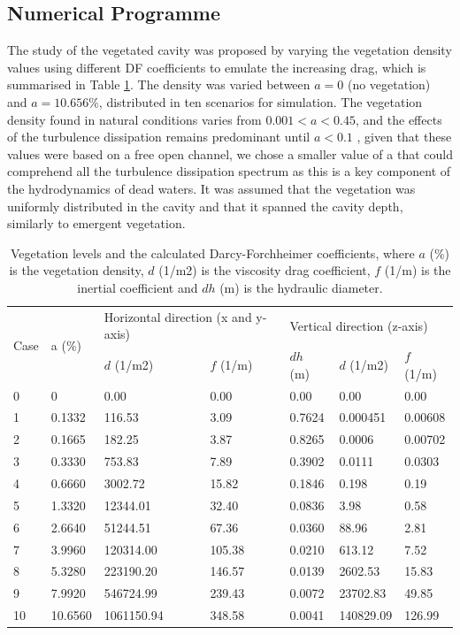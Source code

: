 \subsection{Numerical Programme}
The study of the vegetated cavity was proposed by varying the vegetation density values using different DF coefficients to emulate the increasing drag, which is summarised in Table \ref{tab:art4:cases}. The density was varied between $a = 0$ (no vegetation) and $a = 10.656$\%, distributed in ten scenarios for simulation. The vegetation density found in natural conditions varies from $0.001<a<0.45$, and the effects of the turbulence dissipation remains predominant until  $a<0.1$ \cite{Nepf2012}, given that these values were based on a free open channel, we chose a smaller value of a that could comprehend all the turbulence dissipation spectrum as this is a key component of the hydrodynamics of dead waters. It was assumed that the vegetation was uniformly distributed in the cavity and that it spanned the cavity depth, similarly to emergent vegetation.

\begin{table}[]
\centering
\begin{tabular}{@{}lllllll@{}}
\toprule
\multirow{2}{*}{Case} & \multirow{2}{*}{a (\%)} & \multicolumn{2}{l}{Horizontal direction (x and y-axis)} & \multicolumn{3}{l}{Vertical direction (z-axis)} \\ \cmidrule(l){3-7} 
   &         & $d$ (1/m2)   & $f$ (1/m) & $dh$ (m) & $d$ (1/m2)  & $f$ (1/m) \\ \midrule
0  & 0       & 0.00       & 0.00    & 0.00   & 0.00      & 0.00    \\
1  & 0.1332  & 116.53     & 3.09    & 0.7624 & 0.000451  & 0.00608 \\
2  & 0.1665  & 182.25     & 3.87    & 0.8265 & 0.0006    & 0.00702 \\
3  & 0.3330  & 753.83     & 7.89    & 0.3902 & 0.0111    & 0.0303  \\
4  & 0.6660  & 3002.72    & 15.82   & 0.1846 & 0.198     & 0.19    \\
5  & 1.3320  & 12344.01   & 32.40   & 0.0836 & 3.98      & 0.58    \\
6  & 2.6640  & 51244.51   & 67.36   & 0.0360 & 88.96     & 2.81    \\
7  & 3.9960  & 120314.00  & 105.38  & 0.0210 & 613.12    & 7.52    \\
8  & 5.3280  & 223190.20  & 146.57  & 0.0139 & 2602.53   & 15.83   \\
9  & 7.9920  & 546724.99  & 239.43  & 0.0072 & 23702.83  & 49.85   \\
10 & 10.6560 & 1061150.94 & 348.58  & 0.0041 & 140829.09 & 126.99  \\ \bottomrule
\end{tabular}
\caption{Vegetation levels and the calculated Darcy-Forchheimer coefficients, where $a$ (\%) is the vegetation density, $d$ (1/m2) is the viscosity drag coefficient, $f$ (1/m) is the inertial coefficient and $dh$ (m) is the hydraulic diameter.}
\label{tab:art4:cases}
\end{table}
